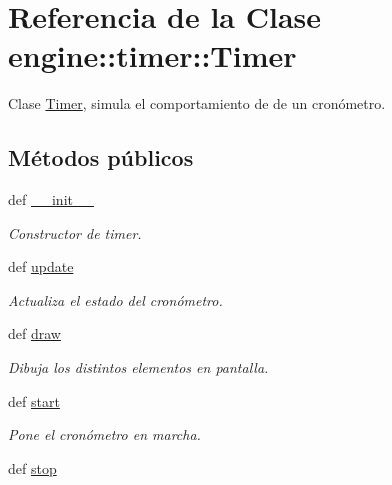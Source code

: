 \hypertarget{classengine_1_1timer_1_1Timer}{
\section{\-Referencia de la \-Clase engine\-:\-:timer\-:\-:\-Timer}
\label{classengine_1_1timer_1_1Timer}
}


\-Clase \hyperlink{classengine_1_1timer_1_1Timer}{\-Timer}, simula el comportamiento de de un cronómetro.  


\subsection*{\-Métodos públicos}
\begin{DoxyCompactItemize}
\item 
def \hyperlink{classengine_1_1timer_1_1Timer_ab275aa60631844f13ad422ebe43b20c1}{\-\_\-\-\_\-init\-\_\-\-\_\-}
\begin{DoxyCompactList}\small\item\em \-Constructor de timer. \end{DoxyCompactList}\item 
\hypertarget{classengine_1_1timer_1_1Timer_ad1c87c32f99f9ed2198efda86e942318}{
def \hyperlink{classengine_1_1timer_1_1Timer_ad1c87c32f99f9ed2198efda86e942318}{update}}
\label{classengine_1_1timer_1_1Timer_ad1c87c32f99f9ed2198efda86e942318}

\begin{DoxyCompactList}\small\item\em \-Actualiza el estado del cronómetro. \end{DoxyCompactList}\item 
def \hyperlink{classengine_1_1timer_1_1Timer_a407189a6c3f8b90705fbe3e8cda49519}{draw}
\begin{DoxyCompactList}\small\item\em \-Dibuja los distintos elementos en pantalla. \end{DoxyCompactList}\item 
\hypertarget{classengine_1_1timer_1_1Timer_a3990ea4b8d38f6bbcfa7b76dbecbd2f1}{
def \hyperlink{classengine_1_1timer_1_1Timer_a3990ea4b8d38f6bbcfa7b76dbecbd2f1}{start}}
\label{classengine_1_1timer_1_1Timer_a3990ea4b8d38f6bbcfa7b76dbecbd2f1}

\begin{DoxyCompactList}\small\item\em \-Pone el cronómetro en marcha. \end{DoxyCompactList}\item 
\hypertarget{classengine_1_1timer_1_1Timer_a00db4f03ab1009361f198a56b27360cc}{
def \hyperlink{classengine_1_1timer_1_1Timer_a00db4f03ab1009361f198a56b27360cc}{stop}}
\label{classengine_1_1timer_1_1Timer_a00db4f03ab1009361f198a56b27360cc}


\end{DoxyCompactItemize}
